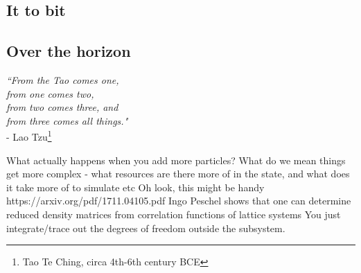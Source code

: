\subsection*{It to bit}%
\subsection*{Over the horizon}%

\begin{adjustwidth}{3cm}{0cm}
\begin{flushright}
\emph{``From the Tao comes one,\\
from one comes two,\\
from two comes three, and\\
from three comes all things."}\\
 - Lao Tzu\footnote{Tao Te Ching, circa 4th-6th century BCE}
\end{flushright}
\end{adjustwidth}
    


	What actually happens when you add more particles? What do we mean things get more complex - what resources are there more of in the state, and what does it take more of to simulate etc
Oh look, this might be handy https://arxiv.org/pdf/1711.04105.pdf
	Ingo Peschel shows that one can determine reduced density matrices from correlation functions of lattice systems \cite{Peschel03} %
	You just integrate/trace out the degrees of freedom outside the subsystem.


